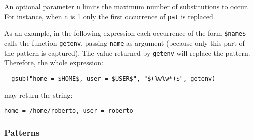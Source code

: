 An optional parameter \verb-n- limits 
the maximum number of substitutions to occur.
For instance, when \verb-n- is 1 only the first occurrence of
\verb-pat- is replaced.

As an example, in the following expression each occurrence of the form
\verb-$name$- calls the function \verb|getenv|,
passing \verb|name| as argument
(because only this part of the pattern is captured).
The value returned by \verb|getenv| will replace the pattern.
Therefore, the whole expression:
\begin{verbatim}
  gsub("home = $HOME$, user = $USER$", "$(%w%w*)$", getenv)
\end{verbatim}
may return the string:
\begin{verbatim}
home = /home/roberto, user = roberto
\end{verbatim}

\subsubsection*{Patterns} \label{pm}

